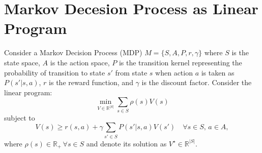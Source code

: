 \documentclass[a3paper,12pt]{extarticle} %
\begin{document}
\newpage
\section{Markov Decesion Process as Linear Program}
Consider a Markov Decision Process (MDP) $M = \{S, A, P, r, \gamma\}$ where $S$ is the state space, $A$ is the action space, $P$ is the transition kernel representing the probability of transition to state $s'$ from state $s$ when action $a$ is taken as $P(s'|s, a)$, $r$ is the reward function, and $\gamma$ is the discount factor. Consider the linear program:
\[
\min_{V \in \mathbb{R}^{|S|}} \sum_{s \in S} \rho(s)V(s)
\]
subject to
\[
V(s) \geq r(s, a) + \gamma \sum_{s' \in S} P(s'|s, a)V(s') \quad \forall s \in S, \, a \in A,
\]
where $\rho(s) \in \mathbb{R}_+ \, \forall s \in S$ and denote its solution as $V^\star \in \mathbb{R}^{|S|}$.
\end{document}
